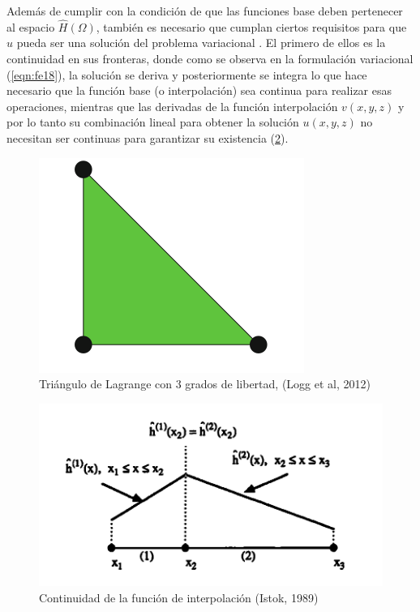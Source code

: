 Además de cumplir con la condición de que las funciones base deben pertenecer al espacio $\hat{H}(\Omega)$, también es necesario que cumplan ciertos requisitos para que $u$ pueda ser una solución del problema variacional \cite{Istok1989}. El primero de ellos es la continuidad en sus fronteras, donde como se observa en la formulación variacional (\ref{eqn:fe18}), la solución se deriva y posteriormente se integra lo que hace necesario que la función base (o interpolación) sea continua para realizar esas operaciones, mientras que las derivadas de la función interpolación $v(x,y,z)$ y por lo tanto su combinación lineal para obtener la solución $u(x,y,z)$ no necesitan ser continuas para garantizar su existencia (\ref{Figura17:2}). 

\begin{figure}[ht!]
\centering
\includegraphics[scale=0.55]{FIgura_16.png}
\caption{ Triángulo de Lagrange con 3 grados de libertad, (Logg et al, 2012)}
\label{Figura16:2}
\end{figure}


\begin{figure}[ht!]
\centering
\includegraphics[scale=0.55]{Figura_17.png}
\caption{ Continuidad de la función de interpolación (Istok, 1989)}
\label{Figura17:2}
\end{figure}

